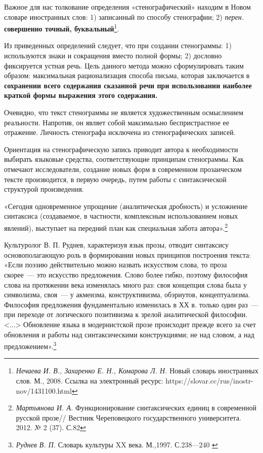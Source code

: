 \documentclass{kursa4}
\begin{document}
    Важное для нас толкование определения «стенографический» находим в Новом
    словаре иностранных слов{: }1) записанный по способу
    стенографии; 2) \textit{перен.} \textbf{совершенно точный,
    буквальный}\footnote{\textit{{Нечаева И. В., Захаренко
    Е. Н., Комарова Л. Н. }}{Новый словарь иностранных
    слов. М., 2008. Ссылка на электронный ресурс:
    https://slovar.cc/rus/inostr-nov/1431100.html}}. 

    Из приведенных определений следует, что при создании стенограммы: 1)
    используются знаки и сокращения вместо полной формы; 2) дословно
    фиксируется устная речь. Цель данного метода можно сформулировать таким
    образом: максимальная рационализация способа письма, которая
    заключается в \textbf{сохранении всего содержания сказанной речи при
    использовании наиболее краткой формы выражения этого содержания.} 

    Очевидно, что текст стенограммы не является художественным
    осмыслением реальности. Напротив, он являет собой максимально
    беспристрастное ее отражение. Личность стенографа исключена из
    стенографических записей. 

    Ориентация на стенографическую запись приводит автора к
    необходимости выбирать языковые средства, соответствующие принципам
    стенограммы. Как отмечают исследователи, создание новых форм в
    современном прозаическом тексте производится, в первую очередь, путем
    работы с синтаксической структурой произведения. 

    {«Сегодня одновременное упрощение (аналитическая
    дробность) и усложнение синтаксиса (создаваемое, в частности,
    комплексным использованием новых явлений), выступает на передний план
    как специальная забота
    автора».}\footnote{\textit{{Мартьянова И. А.
    }}{Функционирование синтаксических единиц в
    современной русской прозе// Вестник Череповецкого государственного университета. 2012. № 2 (37). С.82}}

    {Культуролог В. П. Руднев, характеризуя язык прозы,
    отводит синтаксису основополагающую роль в формировании новых принципов
    построения текста: «Если поэзию действительно можно назвать
    искусством слова, то проза скорее~--- это искусство предложения. Слово
    более гибко, поэтому философия слова на протяжении века изменялась
    много раз: своя концепция слова была у символизма, своя~--- у акмеизма,
    конструктивизма, обэриутов, концептуализма. Философия предложения
    фундаментально изменилась в ХХ в. только один раз~--- при переходе от
    логического позитивизма к зрелой аналитической философии.
    \textless{}...\textgreater{} Обновление языка в модернистской прозе
    происходит прежде всего за счет обновления и работы над
    синтаксическими конструкциями; не над словом, а над
    предложением».}\footnote{\textit{{ Руднев В. П.
    }}{Словарь культуры XX века. М.,1997. С.238—240 }}
\end{document}
